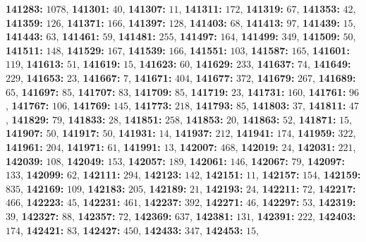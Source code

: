 \textsf{\bfseries 141283:} $1078$, \textsf{\bfseries 141301:} $40$, \textsf{\bfseries 141307:} $11$, \textsf{\bfseries 141311:} $172$, \textsf{\bfseries 141319:} $67$, \textsf{\bfseries 141353:} $42$, \textsf{\bfseries 141359:} $126$, \textsf{\bfseries 141371:} $166$, \textsf{\bfseries 141397:} $128$, \textsf{\bfseries 141403:} $68$, \textsf{\bfseries 141413:} $97$, \textsf{\bfseries 141439:} $15$, \textsf{\bfseries 141443:} $63$, \textsf{\bfseries 141461:} $59$, \textsf{\bfseries 141481:} $255$, \textsf{\bfseries 141497:} $164$, \textsf{\bfseries 141499:} $349$, \textsf{\bfseries 141509:} $50$, \textsf{\bfseries 141511:} $148$, \textsf{\bfseries 141529:} $167$, \textsf{\bfseries 141539:} $166$, \textsf{\bfseries 141551:} $103$, \textsf{\bfseries 141587:} $165$, \textsf{\bfseries 141601:} $119$, \textsf{\bfseries 141613:} $51$, \textsf{\bfseries 141619:} $15$, \textsf{\bfseries 141623:} $60$, \textsf{\bfseries 141629:} $233$, \textsf{\bfseries 141637:} $74$, \textsf{\bfseries 141649:} $229$, \textsf{\bfseries 141653:} $23$, \textsf{\bfseries 141667:} $7$, \textsf{\bfseries 141671:} $404$, \textsf{\bfseries 141677:} $372$, \textsf{\bfseries 141679:} $267$, \textsf{\bfseries 141689:} $65$, \textsf{\bfseries 141697:} $85$, \textsf{\bfseries 141707:} $83$, \textsf{\bfseries 141709:} $85$, \textsf{\bfseries 141719:} $23$, \textsf{\bfseries 141731:} $160$, \textsf{\bfseries 141761:} $96$, \textsf{\bfseries 141767:} $106$, \textsf{\bfseries 141769:} $145$, \textsf{\bfseries 141773:} $218$, \textsf{\bfseries 141793:} $85$, \textsf{\bfseries 141803:} $37$, \textsf{\bfseries 141811:} $47$, \textsf{\bfseries 141829:} $79$, \textsf{\bfseries 141833:} $28$, \textsf{\bfseries 141851:} $258$, \textsf{\bfseries 141853:} $20$, \textsf{\bfseries 141863:} $52$, \textsf{\bfseries 141871:} $15$, \textsf{\bfseries 141907:} $50$, \textsf{\bfseries 141917:} $50$, \textsf{\bfseries 141931:} $14$, \textsf{\bfseries 141937:} $212$, \textsf{\bfseries 141941:} $174$, \textsf{\bfseries 141959:} $322$, \textsf{\bfseries 141961:} $204$, \textsf{\bfseries 141971:} $61$, \textsf{\bfseries 141991:} $13$, \textsf{\bfseries 142007:} $468$, \textsf{\bfseries 142019:} $24$, \textsf{\bfseries 142031:} $221$, \textsf{\bfseries 142039:} $108$, \textsf{\bfseries 142049:} $153$, \textsf{\bfseries 142057:} $189$, \textsf{\bfseries 142061:} $146$, \textsf{\bfseries 142067:} $79$, \textsf{\bfseries 142097:} $133$, \textsf{\bfseries 142099:} $62$, \textsf{\bfseries 142111:} $294$, \textsf{\bfseries 142123:} $142$, \textsf{\bfseries 142151:} $11$, \textsf{\bfseries 142157:} $154$, \textsf{\bfseries 142159:} $835$, \textsf{\bfseries 142169:} $109$, \textsf{\bfseries 142183:} $205$, \textsf{\bfseries 142189:} $21$, \textsf{\bfseries 142193:} $24$, \textsf{\bfseries 142211:} $72$, \textsf{\bfseries 142217:} $466$, \textsf{\bfseries 142223:} $45$, \textsf{\bfseries 142231:} $461$, \textsf{\bfseries 142237:} $392$, \textsf{\bfseries 142271:} $46$, \textsf{\bfseries 142297:} $53$, \textsf{\bfseries 142319:} $39$, \textsf{\bfseries 142327:} $88$, \textsf{\bfseries 142357:} $72$, \textsf{\bfseries 142369:} $637$, \textsf{\bfseries 142381:} $131$, \textsf{\bfseries 142391:} $222$, \textsf{\bfseries 142403:} $174$, \textsf{\bfseries 142421:} $83$, \textsf{\bfseries 142427:} $450$, \textsf{\bfseries 142433:} $347$, \textsf{\bfseries 142453:} $15$, 
